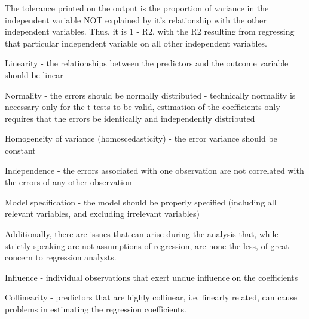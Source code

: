 The tolerance printed on the output is the proportion of variance in the independent variable NOT explained by it's relationship with the other independent variables. Thus, it is 1 - R2, with the R2 resulting from regressing that particular independent variable on all other independent variables.




\item 
Linearity - the relationships between the predictors and the outcome variable should be linear

\item 
Normality - the errors should be normally distributed - technically normality is necessary only for the t-tests to be valid, estimation of the coefficients only requires that the errors be identically and independently distributed

\item 
Homogeneity of variance (homoscedasticity) - the error variance should be constant

\item 
Independence - the errors associated with one observation are not correlated with the errors of any other observation

\item 
Model specification - the model should be properly specified (including all relevant variables, and excluding irrelevant variables)


 

Additionally, there are issues that can arise during the analysis that, while strictly speaking are not assumptions of regression, are none the less, of great concern to regression analysts.

 
\item 
Influence - individual observations that exert undue influence on the coefficients

\item 
Collinearity - predictors that are highly collinear, i.e. linearly related, can cause problems in estimating the regression coefficients.
